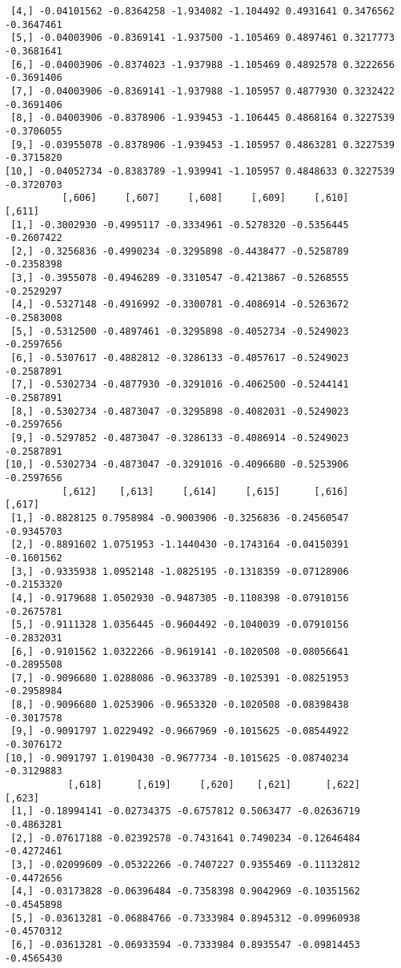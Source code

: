 \documentclass[
  letterpaper,
  DIV=11,
  numbers=noendperiod]{scrreprt}
\begin{document}
\begin{verbatim}
 [4,] -0.04101562 -0.8364258 -1.934082 -1.104492 0.4931641 0.3476562 -0.3647461
 [5,] -0.04003906 -0.8369141 -1.937500 -1.105469 0.4897461 0.3217773 -0.3681641
 [6,] -0.04003906 -0.8374023 -1.937988 -1.105469 0.4892578 0.3222656 -0.3691406
 [7,] -0.04003906 -0.8369141 -1.937988 -1.105957 0.4877930 0.3232422 -0.3691406
 [8,] -0.04003906 -0.8378906 -1.939453 -1.106445 0.4868164 0.3227539 -0.3706055
 [9,] -0.03955078 -0.8378906 -1.939453 -1.105957 0.4863281 0.3227539 -0.3715820
[10,] -0.04052734 -0.8383789 -1.939941 -1.105957 0.4848633 0.3227539 -0.3720703
          [,606]     [,607]     [,608]     [,609]     [,610]     [,611]
 [1,] -0.3002930 -0.4995117 -0.3334961 -0.5278320 -0.5356445 -0.2607422
 [2,] -0.3256836 -0.4990234 -0.3295898 -0.4438477 -0.5258789 -0.2358398
 [3,] -0.3955078 -0.4946289 -0.3310547 -0.4213867 -0.5268555 -0.2529297
 [4,] -0.5327148 -0.4916992 -0.3300781 -0.4086914 -0.5263672 -0.2583008
 [5,] -0.5312500 -0.4897461 -0.3295898 -0.4052734 -0.5249023 -0.2597656
 [6,] -0.5307617 -0.4882812 -0.3286133 -0.4057617 -0.5249023 -0.2587891
 [7,] -0.5302734 -0.4877930 -0.3291016 -0.4062500 -0.5244141 -0.2587891
 [8,] -0.5302734 -0.4873047 -0.3295898 -0.4082031 -0.5249023 -0.2597656
 [9,] -0.5297852 -0.4873047 -0.3286133 -0.4086914 -0.5249023 -0.2587891
[10,] -0.5302734 -0.4873047 -0.3291016 -0.4096680 -0.5253906 -0.2597656
          [,612]    [,613]     [,614]     [,615]      [,616]     [,617]
 [1,] -0.8828125 0.7958984 -0.9003906 -0.3256836 -0.24560547 -0.9345703
 [2,] -0.8891602 1.0751953 -1.1440430 -0.1743164 -0.04150391 -0.1601562
 [3,] -0.9335938 1.0952148 -1.0825195 -0.1318359 -0.07128906 -0.2153320
 [4,] -0.9179688 1.0502930 -0.9487305 -0.1108398 -0.07910156 -0.2675781
 [5,] -0.9111328 1.0356445 -0.9604492 -0.1040039 -0.07910156 -0.2832031
 [6,] -0.9101562 1.0322266 -0.9619141 -0.1020508 -0.08056641 -0.2895508
 [7,] -0.9096680 1.0288086 -0.9633789 -0.1025391 -0.08251953 -0.2958984
 [8,] -0.9096680 1.0253906 -0.9653320 -0.1020508 -0.08398438 -0.3017578
 [9,] -0.9091797 1.0229492 -0.9667969 -0.1015625 -0.08544922 -0.3076172
[10,] -0.9091797 1.0190430 -0.9677734 -0.1015625 -0.08740234 -0.3129883
           [,618]      [,619]     [,620]    [,621]      [,622]     [,623]
 [1,] -0.18994141 -0.02734375 -0.6757812 0.5063477 -0.02636719 -0.4863281
 [2,] -0.07617188 -0.02392578 -0.7431641 0.7490234 -0.12646484 -0.4272461
 [3,] -0.02099609 -0.05322266 -0.7407227 0.9355469 -0.11132812 -0.4472656
 [4,] -0.03173828 -0.06396484 -0.7358398 0.9042969 -0.10351562 -0.4545898
 [5,] -0.03613281 -0.06884766 -0.7333984 0.8945312 -0.09960938 -0.4570312
 [6,] -0.03613281 -0.06933594 -0.7333984 0.8935547 -0.09814453 -0.4565430

\end{verbatim}
\end{document}
